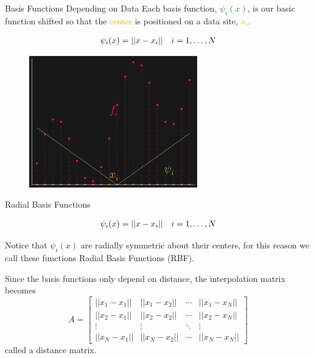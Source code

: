 \documentclass[12pt,t]{beamer}
\newcommand{\subt}[1]{{\footnotesize \color{subtitle} {#1}}}
\begin{document}
\begin{frame}{Basis Functions Depending on Data}
Each basis function, \textcolor{green}{$\psi_i(x)$}, is our basic function shifted so that the \textcolor{orange}{center} is positioned on a data site, \textcolor{orange}{$x_i$}.

\begin{align*}
&\psi_i(x)=||x-x_i||  &i=1, \mathellipsis, N
\end{align*}


\begin{figure}
\includegraphics[width=0.65\textwidth, keepaspectratio]{fig5.png}
\end{figure}


\end{frame}

\begin{frame}{Radial Basis Functions}

\begin{align*}
&\psi_i(x)=||x-x_i||     & i=1, \mathellipsis, N
\end{align*}

Notice that $\psi_i(x)$ are radially symmetric about their centers, for this reason we call these functions \subt{Radial Basis Functions (RBF)}.
\bigskip

Since the basis functions only depend on distance, the interpolation matrix becomes
\begin{equation*}
A=
\begin{bmatrix}
||x_1-x_1|| & ||x_1-x_2|| & \cdots & ||x_1-x_N||\\
||x_2-x_1|| & ||x_2-x_2||& \cdots & ||x_2-x_N||\\
\vdots & \vdots & \ddots & \vdots\\
||x_N-x_1|| & ||x_N-x_2||& \cdots & ||x_N-x_N||
\end{bmatrix}
\end{equation*}
called a \subt{distance matrix}.

\note{}
\end{frame}
\end{document}
